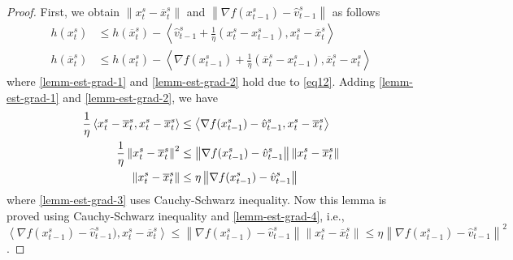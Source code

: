 \documentclass{article}
\newcommand{\norm}[1]{\left\lVert#1\right\rVert}
\newcommand{\Iprod}[2]{\left\langle #1,#2\right\rangle}
\theoremstyle{definition}
\theoremstyle{remark}
\begin{document}
\begin{proof}
First, we obtain $\norm{x_{t}^s-\overline{x}_{t}^s}$ and $\norm{\nabla f(x_{t-1}^s)-\hat{v}_{t-1}^s}$ as follows 
\begin{align}
h(x_t^s)&\leq h(\overline{x}_t^s) - \Iprod{\hat{v}_{t-1}^s+\frac{1}{\eta}(x_t^s-x_{t-1}^s)}{x_t^s-\overline{x}_t^s}\label{lemm-est-grad-1}\\
h(\overline{x}_t^s)&\leq h({x}_t^s) - \Iprod{\nabla f(x_{t-1}^s)+\frac{1}{\eta}(\overline{x}_t^s-x_{t-1}^s)}{\overline{x}_t^s-x_t^s}\label{lemm-est-grad-2}
\end{align}
where \eqref{lemm-est-grad-1} and \eqref{lemm-est-grad-2} hold due to \eqref{eq12}. Adding \eqref{lemm-est-grad-1} and \eqref{lemm-est-grad-2}, we have 
\begin{align}
\frac{1}{\eta}\Iprod{x_t^s -\overline{x}_t^s}{x_t^s -\overline{x}_t^s} &\leq \Iprod{\nabla f(x_{t-1}^s) -\hat{v}_{t-1}^s}{x_t^s -\overline{x}_t^s}\notag\\
\frac{1}{\eta}\norm{x_t^s -\overline{x}_t^s}^2 &\leq \norm{\nabla f(x_{t-1}^s) -\hat{v}_{t-1}^s}\norm{x_t^s -\overline{x}_t^s}\label{lemm-est-grad-3}\\
\norm{x_t^s -\overline{x}_t^s} &\leq \eta\norm{\nabla f(x_{t-1}^s) -\hat{v}_{t-1}^s}\label{lemm-est-grad-4}
\end{align}
where \eqref{lemm-est-grad-3} uses Cauchy-Schwarz inequality. Now this lemma is proved using Cauchy-Schwarz inequality and \eqref{lemm-est-grad-4}, i.e., $\Iprod{\nabla f(x_{t-1}^s) -\hat{v}_{t-1}^s)}{x_t^s -\overline{x}_t^s} \leq \norm{\nabla f(x_{t-1}^s)-\hat{v}_{t-1}^s} \norm{x_t^s -\overline{x}_t^s} \leq \eta\norm{\nabla f(x_{t-1}^s)-\hat{v}_{t-1}^s}^2$.
\end{proof}




\end{document}
